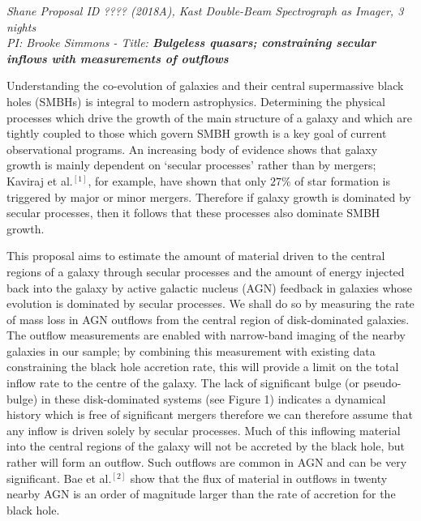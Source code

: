 \documentclass[12pt]{article}
\begin{document}
\noindent \emph{Shane Proposal ID ???? (2018A), Kast Double-Beam Spectrograph as Imager, 3 nights} \\
\noindent \emph{PI: Brooke Simmons - Title: {\bf Bulgeless quasars; constraining secular inflows with measurements of outflows}} 
\vspace{0.5em}

\vspace{0.25em}

Understanding the co-evolution of galaxies and their central supermassive black holes (SMBHs) is integral to modern astrophysics. Determining the physical processes which drive the growth of the main structure of a galaxy and which are tightly coupled to those which govern SMBH growth is a key goal of current observational programs. An increasing body of evidence shows that galaxy growth is mainly dependent on `secular processes' rather than by mergers; Kaviraj et al.$^{[1]}$, for example, have shown that only $27\%$ of star formation is triggered by major or minor mergers. Therefore if galaxy growth is dominated by secular processes, then it follows that these processes also dominate SMBH growth.
\vspace{0.25em}

This proposal aims to estimate the amount of material driven to the central regions of a galaxy through secular processes and the amount of energy injected back into the galaxy by active galactic nucleus (AGN) feedback in galaxies whose evolution is dominated by secular processes. We shall do so by measuring the rate of mass loss in AGN outflows from the central region of disk-dominated galaxies. The outflow measurements are enabled with narrow-band imaging of the nearby galaxies in our sample; by combining this measurement with existing data constraining the black hole accretion rate, this will provide a limit on the total inflow rate to the centre of the galaxy. The lack of significant bulge (or pseudo-bulge) in these disk-dominated systems (see Figure 1) indicates a dynamical history which is free of significant mergers therefore we can therefore assume that any inflow is driven solely by secular processes. Much of this inflowing material into the central regions of the galaxy will not be accreted by the black hole, but rather will form an outflow. Such outflows are common in AGN and can be very significant. Bae et al.$^{[2]}$ show that the flux of material in outflows in twenty nearby AGN is an order of magnitude larger than the rate of accretion for the black hole.
\vspace{0.25em}
\end{document}
